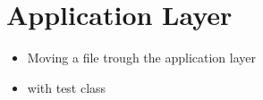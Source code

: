 \section{Application Layer}

\begin{itemize}
\item Moving a file trough the application layer
\item with test class
\end{itemize}